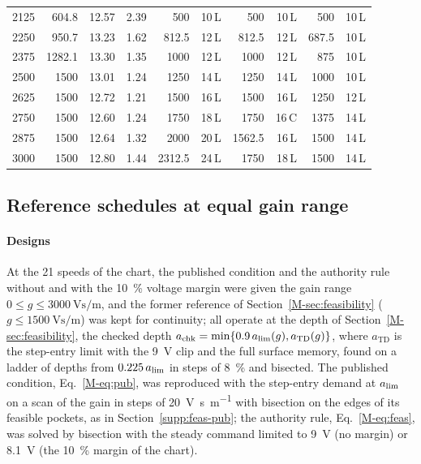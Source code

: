 \begin{table}[!htbp]
\begin{tabular}{@{}rrrrrrrrrr@{}}
    2125 & 604.8 & 12.57 & 2.39 & 500 & 10\,L & 500 & 10\,L & 500 & 10\,L\\
    2250 & 950.7 & 13.23 & 1.62 & 812.5 & 12\,L & 812.5 & 12\,L & 687.5 & 10\,L\\
    2375 & 1282.1 & 13.30 & 1.35 & 1000 & 12\,L & 1000 & 12\,L & 875 & 10\,L\\
    2500 & 1500 & 13.01 & 1.24 & 1250 & 14\,L & 1250 & 14\,L & 1000 & 10\,L\\
    2625 & 1500 & 12.72 & 1.21 & 1500 & 16\,L & 1500 & 16\,L & 1250 & 12\,L\\
    2750 & 1500 & 12.60 & 1.24 & 1750 & 18\,L & 1750 & 16\,C & 1375 & 14\,L\\
    2875 & 1500 & 12.64 & 1.32 & 2000 & 20\,L & 1562.5 & 16\,L & 1500 & 14\,L\\
    3000 & 1500 & 12.80 & 1.44 & 2312.5 & 24\,L & 1750 & 18\,L & 1500 & 14\,L\\
    \bottomrule
  \end{tabular}
\end{table}

\subsection{Reference schedules at equal gain range}\label{supp:ba-refs}

\paragraph{Designs} At the 21 speeds of the chart, the published condition and the authority rule without and with the \SI{10}{\percent} voltage margin were given the gain range $0\le g\le\SI{3000}{\volt\second\per\metre}$, and the former reference of Section~\ref{M-sec:feasibility} ($g\le\SI{1500}{\volt\second\per\metre}$) was kept for continuity; all operate at the depth of Section~\ref{M-sec:feasibility}, the checked depth $a_{\mathrm{chk}}=\min\{0.9\,a_{\lim}(g),a_{\mathrm{TD}}(g)\}$, where $a_{\mathrm{TD}}$ is the step-entry limit with the \SI{9}{\volt} clip and the full surface memory, found on a ladder of depths from $0.225\,a_{\lim}$ in steps of \SI{8}{\percent} and bisected. The published condition, Eq.~\eqref{M-eq:pub}, was reproduced with the step-entry demand at $a_{\lim}$ on a scan of the gain in steps of \SI{20}{\volt\second\per\metre} with bisection on the edges of its feasible pockets, as in Section~\ref{supp:feas-pub}; the authority rule, Eq.~\eqref{M-eq:feas}, was solved by bisection with the steady command limited to \SI{9}{\volt} (no margin) or \SI{8.1}{\volt} (the \SI{10}{\percent} margin of the chart).

